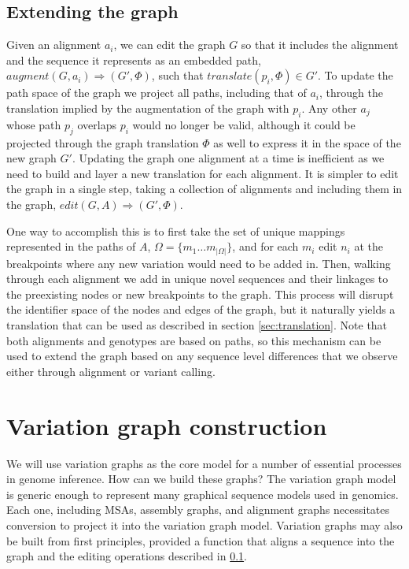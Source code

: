 \subsection{Extending the graph}
\label{sec:extending}

Given an alignment $a_i$, we can edit the graph $G$ so that it includes the alignment and the sequence it represents as an embedded path, $augment(G, a_i) \Rightarrow (G', \Phi)$, such that $translate(p_i, \Phi) \in G'$.
To update the path space of the graph we project all paths, including that of $a_i$, through the translation implied by the augmentation of the graph with $p_i$.
Any other $a_j$ whose path $p_j$ overlaps $p_i$ would no longer be valid, although it could be projected through the graph translation $\Phi$ as well to express it in the space of the new graph $G'$.
Updating the graph one alignment at a time is inefficient as we need to build and layer a new translation for each alignment.
It is simpler to edit the graph in a single step, taking a collection of alignments and including them in the graph, $edit(G, A) \Rightarrow (G', \Phi)$.

One way to accomplish this is to first take the set of unique mappings represented in the paths of $A$, $\Omega = \{ m_1 \ldots m_{|\Omega|}\}$, and for each $m_i$ edit $n_i$ at the breakpoints where any new variation would need to be added in.
Then, walking through each alignment we add in unique novel sequences and their linkages to the preexisting nodes or new breakpoints to the graph.
This process will disrupt the identifier space of the nodes and edges of the graph, but it naturally yields a translation that can be used as described in section \ref{sec:translation}.
Note that both alignments and genotypes are based on paths, so this mechanism can be used to extend the graph based on any sequence level differences that we observe either through alignment or variant calling.

\section{Variation graph construction}

We will use variation graphs as the core model for a number of essential processes in genome inference.
How can we build these graphs?
The variation graph model is generic enough to represent many graphical sequence models used in genomics.
Each one, including MSAs, assembly graphs, and alignment graphs necessitates conversion to project it into the variation graph model.
Variation graphs may also be built from first principles, provided a function that aligns a sequence into the graph and the editing operations described in \ref{sec:extending}.

